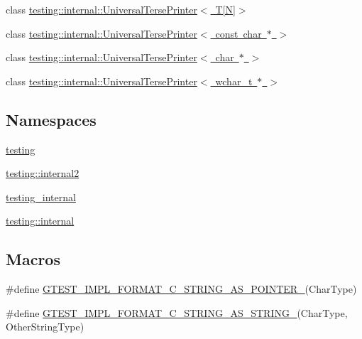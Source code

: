 \begin{DoxyCompactItemize}
\item 
class \mbox{\hyperlink{classtesting_1_1internal_1_1_universal_terse_printer_3_01_t[_n]_4}{testing\+::internal\+::\+Universal\+Terse\+Printer$<$ T\mbox{[}\+N\mbox{]}$>$}}
\item 
class \mbox{\hyperlink{classtesting_1_1internal_1_1_universal_terse_printer_3_01const_01char_01_5_01_4}{testing\+::internal\+::\+Universal\+Terse\+Printer$<$ const char $\ast$ $>$}}
\item 
class \mbox{\hyperlink{classtesting_1_1internal_1_1_universal_terse_printer_3_01char_01_5_01_4}{testing\+::internal\+::\+Universal\+Terse\+Printer$<$ char $\ast$ $>$}}
\item 
class \mbox{\hyperlink{classtesting_1_1internal_1_1_universal_terse_printer_3_01wchar__t_01_5_01_4}{testing\+::internal\+::\+Universal\+Terse\+Printer$<$ wchar\+\_\+t $\ast$ $>$}}
\end{DoxyCompactItemize}
\subsection*{Namespaces}
\begin{DoxyCompactItemize}
\item 
 \mbox{\hyperlink{namespacetesting}{testing}}
\item 
 \mbox{\hyperlink{namespacetesting_1_1internal2}{testing\+::internal2}}
\item 
 \mbox{\hyperlink{namespacetesting__internal}{testing\+\_\+internal}}
\item 
 \mbox{\hyperlink{namespacetesting_1_1internal}{testing\+::internal}}
\end{DoxyCompactItemize}
\subsection*{Macros}
\begin{DoxyCompactItemize}
\item 
\#define \mbox{\hyperlink{_obj__test_2lib_2googletest-master_2googletest_2include_2gtest_2gtest-printers_8h_a79d4724b4bc2a1dd8493c366b5ca626a}{G\+T\+E\+S\+T\+\_\+\+I\+M\+P\+L\+\_\+\+F\+O\+R\+M\+A\+T\+\_\+\+C\+\_\+\+S\+T\+R\+I\+N\+G\+\_\+\+A\+S\+\_\+\+P\+O\+I\+N\+T\+E\+R\+\_\+}}(Char\+Type)
\item 
\#define \mbox{\hyperlink{_obj__test_2lib_2googletest-master_2googletest_2include_2gtest_2gtest-printers_8h_ad6102ed2a0571d5196e606a061c16a10}{G\+T\+E\+S\+T\+\_\+\+I\+M\+P\+L\+\_\+\+F\+O\+R\+M\+A\+T\+\_\+\+C\+\_\+\+S\+T\+R\+I\+N\+G\+\_\+\+A\+S\+\_\+\+S\+T\+R\+I\+N\+G\+\_\+}}(Char\+Type,  Other\+String\+Type)
\end{DoxyCompactItemize}
